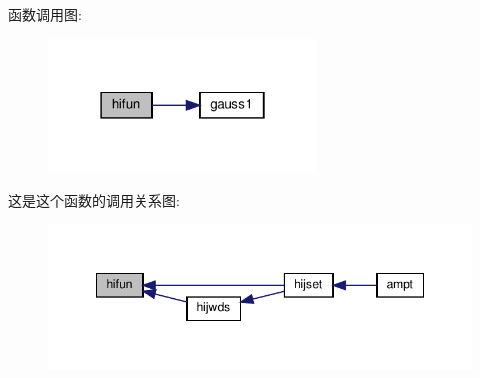 函数调用图\+:
\nopagebreak
\begin{figure}[H]
\begin{center}
\leavevmode
\includegraphics[width=202pt]{hifun_8f90_a1995b86237e7d84791d3f2dc00055fab_cgraph}
\end{center}
\end{figure}
这是这个函数的调用关系图\+:
\nopagebreak
\begin{figure}[H]
\begin{center}
\leavevmode
\includegraphics[width=348pt]{hifun_8f90_a1995b86237e7d84791d3f2dc00055fab_icgraph}
\end{center}
\end{figure}
